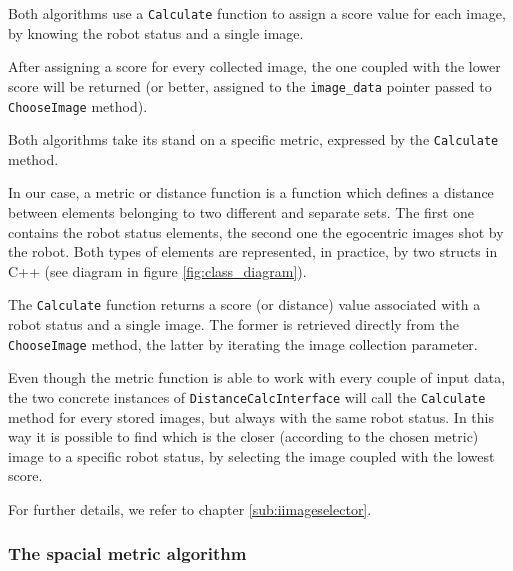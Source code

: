 %

%
Both algorithms use a \texttt{Calculate} function to assign a score
value for each image, by knowing the robot status and a single image.
%

%
After assigning a score for every collected image, the one coupled with the
lower score will be returned (or better, assigned to the \texttt{image\_data}
pointer passed to \texttt{ChooseImage} method).
%

%
Both algorithms take its stand on a specific metric, expressed by the \texttt{Calculate}
method.
%

%
In our case, a metric or distance function is a function which defines a
distance between elements belonging to two different and separate sets. The
first one contains the robot status elements, the second one the egocentric images
shot by the robot. Both types of elements are represented, in practice, by two structs
in C++ (see diagram in figure \ref{fig:class_diagram}).
%

%
The \texttt{Calculate} function returns a score (or distance) value associated with a robot
status and a single image. The former is retrieved directly from the \texttt{ChooseImage} 
method, the latter by iterating the image collection parameter.
%

%
Even though the metric function is able to work with every couple of input
data, the two concrete instances of \texttt{DistanceCalcInterface} will call
the \texttt{Calculate} method for every stored images, but always with the
same robot status. In this way it is possible to find which is the closer (according to the
chosen metric) image to a specific robot status, by selecting the image coupled with the lowest
score.
%

%
For further details, we refer to chapter \ref{sub:iimageselector}.




\subsubsection{The spacial metric algorithm}
\label{subsec:spacial_metric_algorithm}

